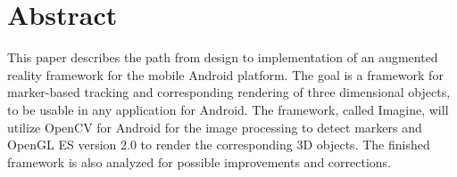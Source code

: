 \section*{Abstract}

This paper describes the path from design to implementation of an augmented reality framework for the mobile Android platform.
The goal is a framework for marker-based tracking and corresponding rendering of three dimensional objects, to be usable in any application for Android.
The framework, called Imagine, will utilize OpenCV for Android for the image processing to detect markers and OpenGL ES version 2.0 to render the corresponding 3D objects.
The finished framework is also analyzed for possible improvements and corrections.
